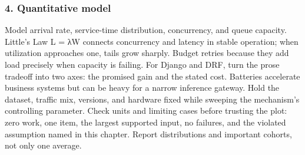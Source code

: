 \subsubsection*{4. Quantitative model}
Model arrival rate, service-time distribution, concurrency, and queue capacity. Little's Law L = λW connects concurrency and latency in stable operation; when utilization approaches one, tails grow sharply. Budget retries because they add load precisely when capacity is failing.
For Django and DRF, turn the prose tradeoff into two axes: the promised gain and the stated cost. Batteries accelerate business systems but can be heavy for a narrow inference gateway. Hold the dataset, traffic mix, versions, and hardware fixed while sweeping the mechanism's controlling parameter.
Check units and limiting cases before trusting the plot: zero work, one item, the largest supported input, no failures, and the violated assumption named in this chapter. Report distributions and important cohorts, not only one average.

